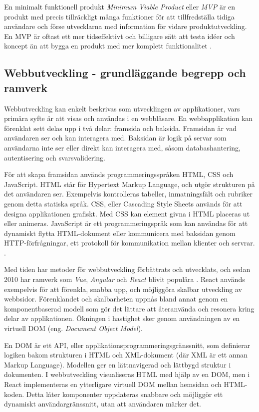 En minimalt funktionell produkt \emph{Minimum Viable Product} eller \emph{MVP} är en produkt med precis tillräckligt många funktioner för att tillfredställa tidiga användare och förse utvecklarna med information för vidare produktutveckling. En MVP är oftast ett mer tidseffektivt och billigare sätt att testa idéer och koncept än att bygga en produkt med mer komplett funktionalitet \cite{ries}. 

\subsection{Webbutveckling - grundläggande begrepp och ramverk}
Webbutveckling kan enkelt beskrivas som utvecklingen av applikationer, vars primära syfte är att visas och användas i en webbläsare. En webbapplikation kan förenklat sett delas upp i två delar: framsida och baksida. Framsidan är vad användaren ser och kan interagera med. Baksidan är logik på servar som användarna inte ser eller direkt kan interagera med, såsom databashantering, autentisering och svarsvalidering.

För att skapa framsidan används programmeringsspråken HTML, CSS och JavaScript. HTML står för Hypertext Markup Language, och utgör strukturen på det användaren ser. Exempelvis kontrolleras tabeller, inmatningsfält och rubriker genom detta statiska språk. CSS, eller Cascading Style Sheets används för att designa applikationen grafiskt. Med CSS kan element givna i HTML placeras ut eller animeras. JavaScript är ett programmeringspråk som kan användas för att dynamiskt flytta HTML-dokument eller kommunicera med baksidan genom HTTP-förfrågningar, ett protokoll för kommunikation mellan klienter och servrar. \cite{Webbutveckling}.

Med tiden har metoder för webbutveckling förbättrats och utvecklats, och sedan 2010 har ramverk som \emph{Vue}, \emph{Angular} och \emph{React} blivit populära \cite{webstats}. React används exempelvis för att förenkla, snabba upp, och möjliggöra skalbar utveckling av webbsidor. Förenklandet och skalbarheten uppnås bland annat genom en komponentbaserad modell som gör det lättare att återanvända och resonera kring delar av applikationen. Ökningen i hastighet sker genom användningen av en virtuell DOM (eng. \emph{Document Object Model}).

En DOM är ett API, eller applikationsprogrammeringsgränssnitt, som definierar logiken bakom strukturen i HTML och XML-dokument (där XML är ett annan Markup Language). Modellen ger en lättnavigerad och lättbygd struktur i dokumenten. I webbutveckling visualiseras HTML med hjälp av en DOM, men i React implementeras en ytterligare virtuell DOM mellan hemsidan och HTML-koden. Detta låter komponenter uppdateras snabbare och möjliggör ett dynamiskt användargränssnitt, utan att användaren märker det.


